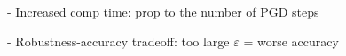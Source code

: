 - Increased comp time: prop to the number of PGD steps

- Robustness-accuracy tradeoff: too large $\varepsilon$ = worse accuracy
















